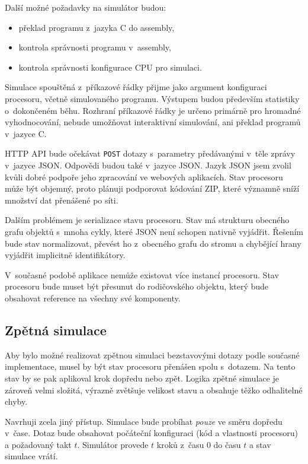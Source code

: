 Další možné požadavky na simulátor budou:
\begin{itemize}
    \item překlad programu z~jazyka C do assembly,
    \item kontrola správnosti programu v~assembly,
    \item kontrola správnosti konfigurace CPU pro simulaci.
\end{itemize}

Simulace spouštěná z~příkazové řádky přijme jako argument konfiguraci procesoru, včetně simulovaného programu.
Výstupem budou především statistiky o~dokončeném běhu.
Rozhraní příkazové řádky je určeno primárně pro hromadné vyhodnocování, nebude umožňovat interaktivní simulování, ani překlad programů v~jazyce C.

HTTP API bude očekávat \texttt{POST} dotazy s~parametry předávanými v~těle zprávy v~jazyce JSON.
Odpovědi budou také v~jazyce JSON.
Jazyk JSON jsem zvolil kvůli dobré podpoře jeho zpracování ve webových aplikacích.
Stav procesoru může být objemný, proto plánuji podporovat kódování ZIP, které významně sníží množství dat přenášené po síti.

Dalším problémem je serializace stavu procesoru.
Stav má strukturu obecného grafu objektů s~mnoha cykly, které JSON není schopen nativně vyjádřit.
Řešením bude stav normalizovat, převést ho z~obecného grafu do stromu a chybějící hrany vyjádřit implicitně identifikátory. 

V~současné podobě aplikace nemůže existovat více instancí procesoru.
Stav procesoru bude muset být přesunut do rodičovského objektu, který bude obsahovat reference na všechny své komponenty.

\subsection{Zpětná simulace}
\label{backSimNewDesign}

Aby bylo možné realizovat zpětnou simulaci bezstavovými dotazy podle současné implementace, musel by být stav procesoru přenášen spolu s~dotazem.
Na tento stav by se pak aplikoval krok dopředu nebo zpět.
Logika zpětné simulace je zároveň velmi složitá, výrazně zvětšuje velikost stavu a obsahuje těžko odhalitelné chyby.

Navrhuji zcela jiný přístup.
Simulace bude probíhat \emph{pouze} ve směru dopředu v~čase.
Dotaz bude obsahovat počáteční konfiguraci (kód a vlastnosti procesoru) a požadovaný takt $t$.
Simulátor provede $t$ kroků z~času $0$ do času $t$ a stav simulace vrátí.

